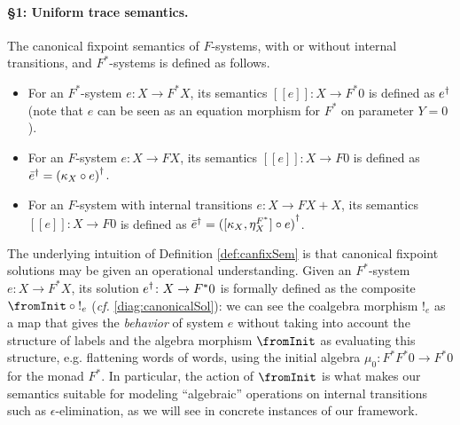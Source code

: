 \documentclass[oribibl,envcountsame,envcountsect,runningheads]{llncs}
\newcommand{\free}[1]{{#1^*}}
\newcommand{\toFinal}[1]{{!_{#1}}}\DeclareMathSymbol{\fromInit}{\mathord}{operators}{"3C}
\renewcommand{\>}{\rangle}
\newcommand{\bb}[1]{[\![ #1 ]\!]}
\def\:{\colon}
\def\GF{F} \def\GFG{G} \def\MM{R} \def\quot{\xi} \def\quotG{\gamma}
\begin{document}
\paragraph{\bf \S 1: Uniform trace semantics.}  The canonical fixpoint semantics of $\GF $-systems, with or without internal transitions, and $\free{\GF }$-systems is defined as follows.
 \begin{definition} \label{def:canfixSem}
\begin{itemize}
  \item For an $\free{\GF }$-system $e\colon X \to\free{\GF }X$, its semantics $\bb{e} \colon X \to \free{\GF }0$ is defined as ${e}^\dag$
(note that $e$ can be seen as  an equation morphism for $\free{\GF }$ on parameter $Y = 0$).
\item For an $\GF $-system $e:X \to\GF X$, its semantics $\bb{e} \colon X \to \GF 0$ is defined as ${\bar{e}}^\dag= {(\kappa_X \circ e)}^\dag$.
\item For an $\GF $-system with internal transitions $e:X \to \GF X+X$, its semantics $\bb{e} \colon X \to \GF 0$ is defined as $\cansol {\bar{e}}= \cansol {([\kappa_X,\eta_X^{\free{\GF }}] \circ e)}$.
\end{itemize}
\end{definition}
The underlying intuition of Definition \ref{def:canfixSem} is that canonical fixpoint solutions may be given an operational understanding. Given an $\free{\GF }$-system $e\: X \to \free{\GF }X$, its solution $\cansol{e}\: X \to \free{\GF }0$ is formally defined as the composite $\fromInit \circ \toFinal{e}$ (\emph{cf.} \eqref{diag:canonicalSol}): we can see the coalgebra morphism $\toFinal{e}$ as a map that gives the \emph{behavior} of system $e$ without taking into account the structure of labels and the algebra morphism $\fromInit$
as evaluating this structure, e.g. flattening words of words, using the initial algebra $\mu_0 \: \free{\GF }\free{\GF }0 \to \free{\GF }0$ for the monad $\free{\GF}$. In particular, the action of $\fromInit$ is what makes our semantics suitable for modeling ``algebraic'' operations on internal transitions such as $\epsilon$-elimination, as we will see in concrete instances of our framework.
\end{document}
